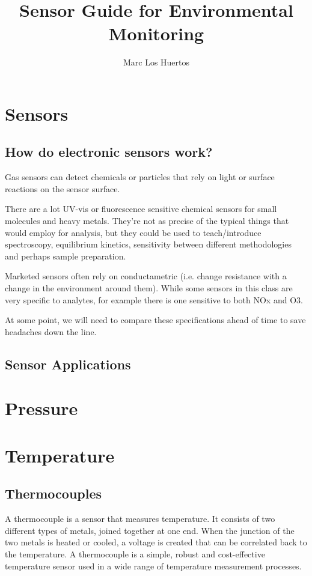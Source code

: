 \documentclass{article}\usepackage[]{graphicx}\usepackage[]{color}
\author{Marc Los Huertos}
\title{Sensor Guide for Environmental Monitoring}
\begin{document}
\maketitle

\section{Sensors}

\subsection{How do electronic sensors work?}

Gas sensors can detect chemicals or particles that rely on light or surface reactions on the sensor surface. 

There are a lot UV-vis or fluorescence sensitive chemical sensors for small molecules and heavy metals. They're not as precise of the typical things that would employ for analysis, but they could be used to teach/introduce  spectroscopy, equilibrium kinetics,  sensitivity between different methodologies and perhaps sample preparation.  

Marketed sensors often rely on conductametric (i.e. change resistance with a change in the environment around them). While some sensors in this class are very specific to analytes, for example there is one  sensitive to both NOx and O3. 

At some point, we will need to compare these specifications ahead of time to save headaches down the line.

\subsection{Sensor Applications}

\section{Pressure}

\section{Temperature}

\subsection{Thermocouples}

A thermocouple is a sensor that measures temperature. It consists of two different types of metals, joined together at one end. When the junction of the two metals is heated or cooled, a voltage is created that can be correlated back to the temperature. A thermocouple is a simple, robust and cost-effective temperature sensor used in a wide range of temperature measurement processes.
\end{document}
